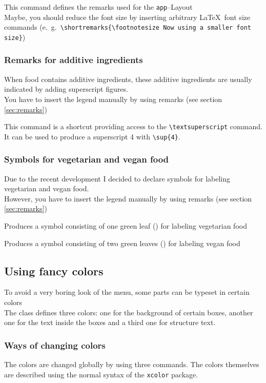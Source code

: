 \documentclass[11pt]{ltxdoc}
\begin{document}
	\medskip
	\DescribeMacro{\shortremarks}
	This command defines the remarks used for the \texttt{app}--Layout \\
	Maybe, you should reduce the font size by inserting arbitrary \LaTeX\ font size commands (e.~g.~\verb|\shortremarks{\footnotesize Now using a smaller font size}|)
	
	
	\subsubsection{Remarks for additive ingredients}
	When food contains additive ingredients, these additive ingredients are usually indicated by adding superscript figures. \\
	You have to insert the legend manually by using remarks (see section \ref{sec:remarks})
	
	\medskip
	\DescribeMacro{\sup}
	This command is a shortcut providing access to the \verb|\textsuperscript| command. \\
	It can be used to produce a superscript 4 with \verb|\sup{4}|.
	
	
	\subsubsection{Symbols for vegetarian and vegan food}
	Due to the recent development I decided to declare symbols for labeling vegetarian and vegan food. \\
	However, you have to insert the legend manually by using remarks (see section \ref{sec:remarks})
	
	\medskip
	\DescribeMacro{\vgt}
	Produces a symbol consisting of one green leaf ({\color{green!50!black}\textleaf}) for labeling vegetarian food
	
	\medskip
	\DescribeMacro{\vgn}
	Produces a symbol consisting of two green leaves ({\color{green!50!black}\textleaf\textleaf}) for labeling vegan food
	
	
	\subsection{Using fancy colors}
	To avoid a very boring look of the menu, some parts can be typeset in certain colors \\
	The class defines three colors: one for the background of certain boxes, another one for the text inside the boxes and a third one for structure text.
	
	\subsubsection{Ways of changing colors}
	The colors are changed globally by using three commands. The colors themselves are described using the normal syntax of the \texttt{xcolor} package.
	
\end{document}
